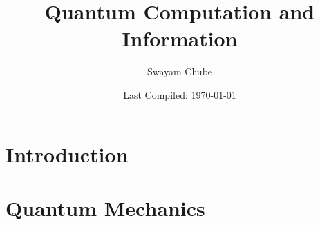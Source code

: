 \documentclass[12pt, oneside]{report}
\title{Quantum Computation and Information}
\author{Swayam Chube}
\date{Last Compiled: \today}
\begin{document}
    \maketitle
    \tableofcontents

    \chapter{Introduction}
    \chapter{Quantum Mechanics}
    
\end{document}
